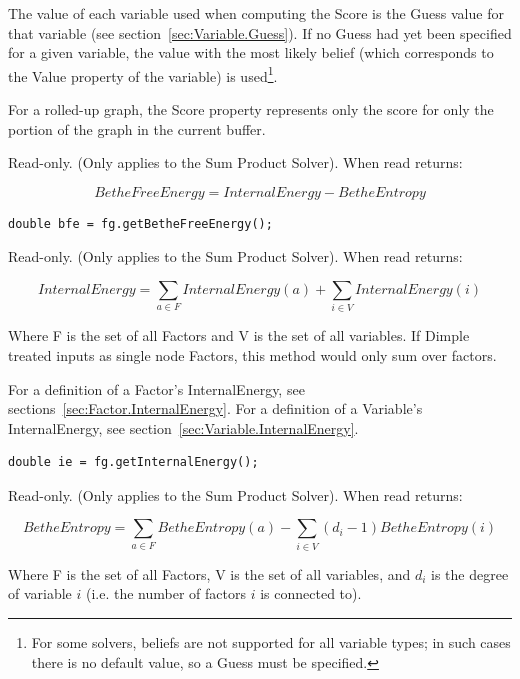 The value of each variable used when computing the Score is the Guess value for that variable (see section~\ref{sec:Variable.Guess}).  If no Guess had yet been specified for a given variable, the value with the most likely belief (which corresponds to the Value property of the variable) is used\footnote{For some solvers, beliefs are not supported for all variable types; in such cases there is no default value, so a Guess must be specified.}.

For a rolled-up graph, the Score property represents only the score for only the portion of the graph in the current buffer.


\label{sec:FactorGraph.BetheFreeEnergy}

Read-only.  (Only applies to the Sum Product Solver).  When read returns:

\[
BetheFreeEnergy = InternalEnergy - BetheEntropy
\]

\ifjava
\begin{lstlisting}
double bfe = fg.getBetheFreeEnergy();
\end{lstlisting}
\fi

\label{sec:FactorGraph.InternalEnergy}

Read-only.  (Only applies to the Sum Product Solver).  When read returns:

\[
InternalEnergy = \sum_{a \in F }InternalEnergy(a) + \sum_{i \in V}InternalEnergy(i)
\]

Where F is the set of all Factors and V is the set of all variables.  If Dimple treated inputs as single node Factors, this method would only sum over factors.

For a definition of a Factor's InternalEnergy, see sections~\ref{sec:Factor.InternalEnergy}.  For a definition of a Variable's InternalEnergy, see section~\ref{sec:Variable.InternalEnergy}.

\ifjava
\begin{lstlisting}
double ie = fg.getInternalEnergy();
\end{lstlisting}
\fi

\label{sec:FactorGraph.BetheEntropy}

Read-only.  (Only applies to the Sum Product Solver).  When read returns:

\[
 BetheEntropy = \sum_{a \in F}BetheEntropy(a) - \sum_{i \in V}(d_i-1) BetheEntropy(i) 
 \]

Where F is the set of all Factors, V is the set of all variables, and $d_i$ is the degree of variable $i$ (i.e. the number of factors $i$ is connected to).

